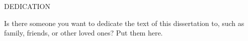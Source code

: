 

\vspace*{\fill}

\begin{center}
    DEDICATION

    \vspace{1em}

    Is there someone you want to dedicate the text of this dissertation to, such as family, friends, or other loved ones?  Put them here.
\end{center}

\vspace*{\fill}

